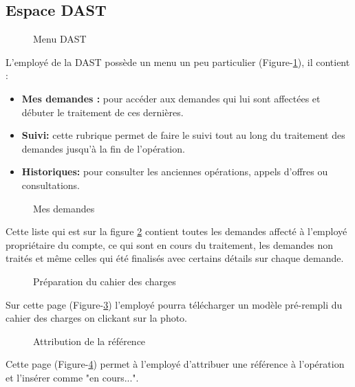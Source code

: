 \documentclass{report}
\begin{document}
\subsection{Espace DAST}
\begin{figure}[h]
        \centering
        \caption{Menu DAST}
        \label{6}
\end{figure}
\vspace{0.4cm}
L'employé de la DAST possède un menu un peu particulier (Figure-\ref{6}), il contient :
\begin{itemize}
    \item \textbf{Mes demandes :} pour accéder aux demandes qui lui sont affectées et débuter le traitement de ces dernières.
    \item \textbf{Suivi:} cette rubrique permet de faire le suivi tout au long du traitement des demandes jusqu'à la fin de l'opération.
    \item \textbf{Historiques:} pour consulter les anciennes opérations, appels d'offres ou consultations.
\end{itemize}

\vspace{0.2cm}
\begin{figure}[h]
        \centering
        \caption{Mes demandes}
        \label{7}
\end{figure}
Cette liste qui est sur la figure \ref{7} contient toutes les demandes affecté à l'employé propriétaire du compte, ce qui sont en cours du traitement, les demandes non traités et même celles qui été finalisés avec certains détails sur chaque demande.

\newpage
\begin{figure}[h]
        \centering
        \caption{Préparation du cahier des charges}
        \label{8}
\end{figure}
Sur cette page (Figure-\ref{8}) l'employé pourra télécharger un modèle pré-rempli du cahier des charges on clickant sur la photo.

\vspace{0.4cm}
\begin{figure}[h]
        \centering
        \caption{Attribution de la référence}
        \label{9}
\end{figure}
Cette page (Figure-\ref{9}) permet à l'employé d'attribuer une référence à l’opération et l’insérer comme "en cours...".
\end{document}
